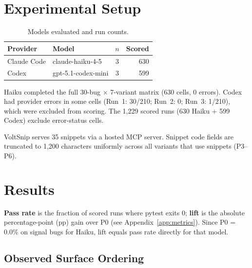 \documentclass[10pt,conference]{IEEEtran}
\begin{document}
\section{Experimental Setup}
\label{sec:setup}

\begin{table}[t]
\centering
\caption{Models evaluated and run counts.}
\label{tab:models}
\small
\begin{tabular}{@{}llcr@{}}
\toprule
\textbf{Provider} & \textbf{Model} & \textbf{$n$} & \textbf{Scored} \\
\midrule
Claude Code & claude-haiku-4-5   & 3 & 630 \\
Codex       & gpt-5.1-codex-mini & 3 & 599 \\
\bottomrule
\end{tabular}
\end{table}

Haiku completed the full 30-bug $\times$ 7-variant matrix (630 cells, 0 errors).
Codex had provider errors in some cells (Run~1: 30/210; Run~2: 0; Run~3: 1/210), which were excluded from scoring.
The 1,229 scored runs (630 Haiku + 599 Codex) exclude error-status cells.

VoltSnip serves 35 snippets via a hosted MCP server.
Snippet code fields are truncated to 1,200 characters uniformly across all variants that use snippets (P3--P6).

\section{Results}
\label{sec:results}

\textbf{Pass rate} is the fraction of scored runs where pytest exits 0; \textbf{lift} is the absolute percentage-point (pp) gain over P0 (see Appendix~\ref{app:metrics}).
Since P0 = 0.0\% on signal bugs for Haiku, lift equals pass rate directly for that model.

\subsection{Observed Surface Ordering}
\label{sec:surface-hierarchy}
\end{document}
